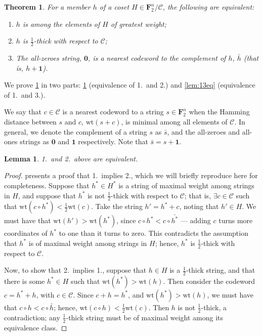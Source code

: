 \documentclass{article}
\newtheorem{lemma}{Lemma}
\newtheorem{theorem}{Theorem}
\newcommand{\FF}{\mathbf{F}}
\newcommand{\calC}{\mathcal{C}}
\newcommand{\wt}{\text{wt}}
\begin{document}
\begin{theorem}\label{thm:structure}
    For a member $h$ of a coset $H \in \FF_2^n/\calC$, the following are equivalent:
    \begin{enumerate}
    \item $h$ is among the elements of $H$ of greatest weight;
    \item $h$ is $\frac12$-thick with respect to $\calC$;
    \item The all-zeroes string, $\mathbf{0}$, is a nearest codeword to the complement of $h$, $\bar{h}$ (that is, $h + \mathbf{1}$).
    \end{enumerate}
\end{theorem}

We prove \cref{thm:structure} in two parts: \cref{lem:12eq} (equivalence of 1.\ and 2.) and \cref{lem:13eq} (equivalence of 1.\ and 3.).

We say that $c \in \calC$ is a nearest codeword to a string $s \in \FF_2^n$ when the Hamming distance between $s$ and $c$, $\wt(s + c)$, is minimal among all elements of $\calC$. In general, we denote the complement of a string $s$ as $\bar{s}$, and the all-zeroes and all-ones strings as $\mathbf{0}$ and $\mathbf{1}$ respectively. Note that $\bar{s} = s + \mathbf{1}$.

\begin{lemma}\label{lem:12eq}
    1.\ and 2.\ above are equivalent.
\end{lemma}
\begin{proof}
  \cite{GharanSahami2025} presents a proof that 1.\ implies 2., which we will briefly reproduce here for completeness. Suppose that $h^* \in H^*$ is a string of maximal weight among strings in $H$, and suppose that $h^*$ is not $\frac12$-thick with respect to $\calC$; that is, $\exists c \in \calC$ such that $\wt(c \circ h^*) < \frac{1}{2}\wt(c)$. Take the string $h' = h^* + c$, noting that $h' \in H$. We must have that $\wt(h') > \wt(h^*)$, since $c\circ h^* < c\circ \bar{h^*}$ --- adding $c$ turns more coordinates of $h^*$ to one than it turns to zero. This contradicts the assumption that $h^*$ is of maximal weight among strings in $H$; hence, $h^*$ is $\frac12$-thick with respect to $\calC$.

    Now, to show that 2.\ implies 1., suppose that $h \in H$ is a $\frac12$-thick string, and that there is some $h^* \in H$ such that $\wt(h^*) > \wt(h)$. Then consider the codeword $c = h^* + h$, with $c \in \calC$. Since $c + h = h^*$, and $\wt(h^*) > \wt(h)$, we must have that $c \circ h < c \circ \bar{h}$; hence, $\wt(c \circ h) < \frac{1}{2}\wt(c)$. Then $h$ is not $\frac12$-thick, a contradiction; any $\frac12$-thick string must be of maximal weight among its equivalence class.
\end{proof}
\end{document}
